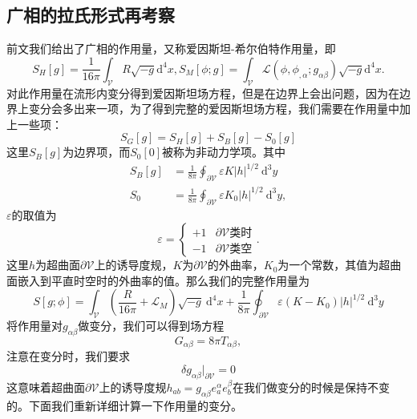 \documentclass[hyperref, UTF8, a4paper]{ctexart}
\begin{document}
\subsection{广相的拉氏形式再考察}

前文我们给出了广相的作用量，又称爱因斯坦-希尔伯特作用量，即
\begin{equation*}
	S_{H}[ g] =\frac{1}{16\pi }\int _{\mathscr{V}} R\sqrt{-g}\mathrm{d}^{4} x,S_{M}[ \phi ;g] =\int _{\mathscr{V}}\mathcal{L}( \phi ,\phi _{,\alpha } ;g_{\alpha \beta })\sqrt{-g}\mathrm{d}^{4} x.
\end{equation*}
对此作用量在流形内变分得到爱因斯坦场方程，但是在边界上会出问题，因为在边界上变分会多出来一项，为了得到完整的爱因斯坦场方程，我们需要在作用量中加上一些项：
\begin{equation*}
	S_{G}[ g] =S_{H}[ g] +S_{B}[ g] -S_{0}[ g]
\end{equation*}
这里$S_{B}[ g]$为边界项，而$S_{0}[ 0]$被称为非动力学项。其中
\begin{equation*}
	\begin{aligned}
		S_{B} [g] & =\frac{1}{8\pi }\oint _{\partial \mathscr{V}} \varepsilon K|h|^{1/2} \ \mathrm{d}^{3} y\\
		S_{0} & =\frac{1}{8\pi }\oint _{\partial \mathscr{V}} \varepsilon K_{0} |h|^{1/2} \ \mathrm{d}^{3} y,
	\end{aligned}
\end{equation*}
$\varepsilon $的取值为
\begin{equation*}
	\varepsilon =\begin{cases}
		+1 & \partial \mathscr{V}\text{类时}\\
		-1 & \partial \mathscr{V}\text{类空}
	\end{cases} .
\end{equation*}
这里$h$为超曲面$\partial \mathscr{V}$上的诱导度规，$K$为$\partial \mathscr{V}$的外曲率，$K_{0}$为一个常数，其值为超曲面嵌入到平直时空时的外曲率的值。那么我们的完整作用量为
\begin{equation*}
	\boxed{S[g;\phi ]=\int _{\mathscr{V}}\left(\frac{R}{16\pi } +\mathcal{L}_{M}\right)\sqrt{-g} \ \mathrm{d}^{4} x+\frac{1}{8\pi }\oint _{\mathscr{\ \partial V}} \varepsilon ( K-K_{0}) |h|^{1/2} \ \mathrm{d}^{3} y}
\end{equation*}
将作用量对$g_{\alpha \beta }$做变分，我们可以得到场方程
\begin{equation*}
	G_{\alpha \beta } =8\pi T_{\alpha \beta } ,
\end{equation*}
注意在变分时，我们要求
\begin{equation*}
	\delta g_{\alpha \beta } |_{\partial \mathscr{V}} =0
\end{equation*}
这意味着超曲面$\partial \mathscr{V}$上的诱导度规$h_{ab} =g_{\alpha \beta } e_{a}^{\alpha } e_{b}^{\beta }$在我们做变分的时候是保持不变的。下面我们重新详细计算一下作用量的变分。
\end{document}
